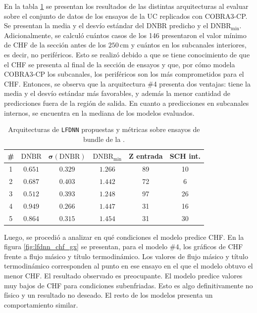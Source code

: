 En la tabla \ref{tab:lfdnn_dnbrmin} se presentan los resultados de las distintas arquitecturas al evaluar sobre el conjunto de datos de los ensayos de la UC replicados con COBRA3-CP. Se presentan la media y el desvío estándar del $\mathrm{DNBR}$ predicho y el $\mathrm{DNBR}_\mathrm{min}$. Adicionalmente, se calculó cuántos casos de los 146 presentaron el valor mínimo de CHF de la sección antes de los $250\,\mathrm{cm}$ y cuántos en los subcanales interiores, es decir, no periféricos. Esto se realizó debido a que se tiene conocimiento de que el CHF se presenta al final de la sección de ensayos y que, por cómo modela COBRA3-CP los subcanales, los periféricos son los más comprometidos para el CHF. Entonces, se observa que la arquitectura \#4 presenta dos ventajas: tiene la media y el desvío estándar más favorables, y además la menor cantidad de predicciones fuera de la región de salida. En cuanto a predicciones en subcanales internos, se encuentra en la mediana de los modelos evaluados. 


\begin{table}[h]
	\centering
	\caption{Arquitecturas de \texttt{LFDNN} propuestas y métricas sobre ensayos de bundle de la \cna{}.}
	\begin{tabular}{c c c c c c} 
        \toprule
        \textbf{\#} & $\bm{\overline{\mathrm{DNBR}}}$ & $\bm{\sigma(\mathrm{DNBR})}$ &  $\bm{\mathrm{DNBR}_\mathrm{min}}$ & \textbf{Z entrada} & \textbf{SCH int.} \\ \hline
        1 & $0.651$ & $0.329$ & $1.266$ & 89 & 10 \\
        2 & $0.687$ & $0.403$ & $1.442$ & 72 & 6  \\
        3 & $0.512$ & $0.393$ & $1.248$ & 97 & 26 \\
        4 & $0.949$ & $0.266$ & $1.447$ & 31 & 16 \\
        5 & $0.864$ & $0.315$ & $1.454$ & 31 & 30\\
		\bottomrule
	\end{tabular}
	\label{tab:lfdnn_dnbrmin}
\end{table}

Luego, se procedió a analizar en qué condiciones el modelo predice CHF. En la figura \ref{fig:lfdnn_chf_gx} se presentan, para el modelo \#4, los gráficos de CHF frente a flujo másico y título termodinámico. Los valores de flujo másico y título termodinámico corresponden al punto en ese ensayo en el que el modelo obtuvo el menor CHF. El resultado observado es preocupante. El modelo predice valores muy bajos de CHF para condiciones subenfriadas. Esto es algo definitivamente no físico y un resultado no deseado. El resto de los modelos presenta un comportamiento similar. 


